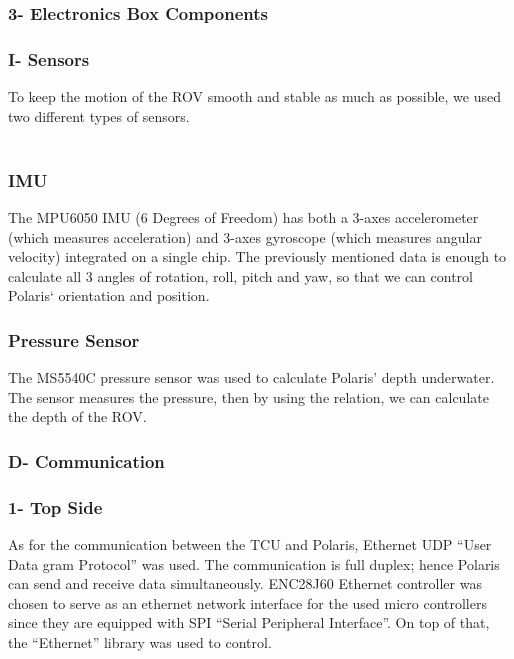 \documentclass[a4paper,12pt,leqno]{report}
\begin{document}
\textcolor{orange!90}{
	\subsubsection{3- Electronics Box Components }}
\textcolor{red!90}{
	\subsubsection{I- Sensors}}	
To keep the motion of the ROV smooth and stable as much as possible,  we used two different types of sensors.\\
\\

\textcolor{green!90}{
	\subsubsection{IMU}}	
The MPU6050 IMU (6 Degrees of Freedom) has both a 3-axes  accelerometer (which measures acceleration) and 3-axes gyroscope  (which measures angular velocity) integrated on a single chip. The  previously mentioned data is enough to calculate all 3 angles of rotation,  roll, pitch and yaw, so that we can control Polaris‘ orientation and position. \\
\textcolor{green!90}{
	\subsubsection{Pressure Sensor}}	
The MS5540C pressure sensor was used to calculate Polaris’ depth underwater. The sensor measures the pressure, then by using the relation, we can calculate the depth of the ROV.\\
\textcolor{blue!40}{
	\subsubsection{D- Communication}}
\textcolor{orange!90}{
	\subsubsection{1- Top Side }}	
As for the communication between the TCU and Polaris, Ethernet UDP “User  Data gram Protocol” was used. The communication is full duplex; hence  Polaris can send and receive data simultaneously. ENC28J60 Ethernet  controller was chosen to serve as an ethernet network interface for the used   
micro controllers since they are equipped with SPI “Serial Peripheral  Interface”. On top of that, the “Ethernet” library was used to control.\\
\end{document}
